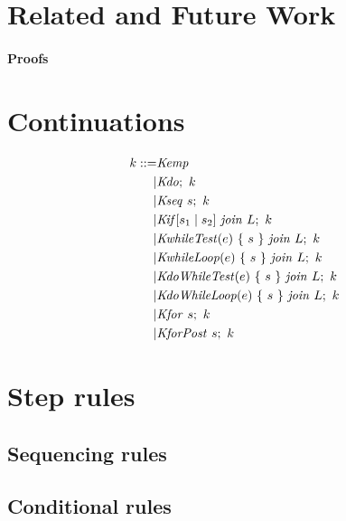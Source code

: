 \documentclass[acmsmall,review,anonymous]{acmart}\settopmatter{printfolios=true,printccs=false,printacmref=false}
\begin{document}
\section{Related and Future Work}
\label{sec:relwork}

\paragraph{Proofs}



\appendix

\section{Continuations}
\label{app:continuations}

\[\begin{split}
k ::= & \mathit{Kemp} \\
| & \mathit{Kdo};~ k \\
| & \mathit{Kseq} ~ s; ~ k \\
| & \mathit{Kif}[s_1 \mid s_2] ~ \mathit{join} ~ L; ~ k \\
| & \mathit{KwhileTest}(e) ~ \{ ~ s ~ \} ~ \mathit{join} ~ L; ~ k \\
| & \mathit{KwhileLoop}(e) ~ \{ ~ s ~ \} ~ \mathit{join} ~ L; ~ k \\
| & \mathit{KdoWhileTest}(e) ~ \{ ~ s ~ \} ~ \mathit{join} ~ L; ~ k \\
| & \mathit{KdoWhileLoop}(e) ~ \{ ~ s ~ \} ~ \mathit{join} ~ L; ~ k \\
| & \mathit{Kfor} ~ s; ~ k \\
| & \mathit{KforPost} ~ s; ~ k \\
\end{split}\]

\section{Step rules}
\label{app:rules}

\subsection{Sequencing rules}

\dostepa
\dostepb
\seqstep
\seqskipstep
\seqcontinuestep
\seqbreakstep
\retvalstep
{}

\subsection{Conditional rules}

\ifstepa
\ifstepb
\end{document}
